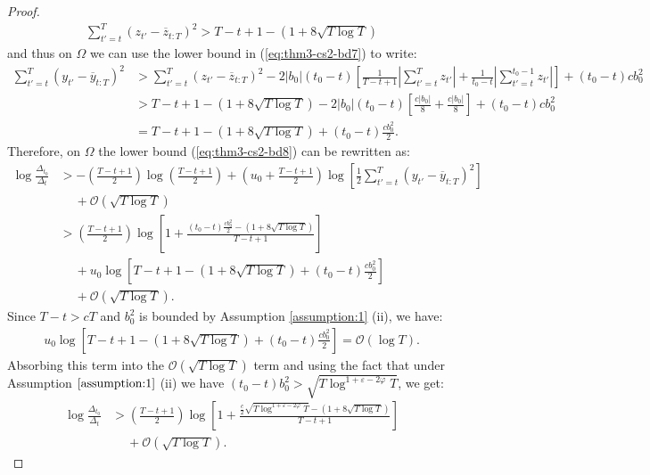 \begin{proof}
\begin{align*}
    \sum_{t'=t}^T (z_{t'} - \overline{z}_{t:T})^2 > T-t +1 - (1 + 8\sqrt{T \log T})
\end{align*}
and thus on $\Omega$ we can use the lower bound in (\ref{eq:thm3-cs2-bd7}) to write:
\begin{align*}
    \sum_{t'=t}^T (y_{t'} - \overline{y}_{t:T})^2 &> \sum_{t'=t}^T (z_{t'} - \overline{z}_{t:T})^2 - 2|b_0|(t_0-t)\left[\frac{1}{T-t+1} \left|\sum_{t'=t}^T z_{t'}\right| + \frac{1}{t_0-t}\left|\sum_{t' = t}^{t_0 - 1} z_{t'}\right|\right] + (t_0-t)cb_0^2 \\
    &> T-t +1 - (1 + 8\sqrt{T \log T}) - 2|b_0|(t_0-t)\left[\frac{c|b_0|}{8} + \frac{c|b_0|}{8}\right] + (t_0-t)cb_0^2 \\
    &= T-t +1 - (1 + 8\sqrt{T \log T}) + (t_0-t)\frac{cb_0^2}{2}.
\end{align*}
Therefore, on $\Omega$ the lower bound (\ref{eq:thm3-cs2-bd8}) can be rewritten as:
\begin{align*}
    \log \frac{\Delta_{t_0}}{\Delta_t} &> - \left(\frac{T - t + 1}{2}\right) \log\left(\frac{T-t+1}{2}\right) + \left(u_0 + \frac{T - t +1}{2}\right)\log\left[ \frac{1}{2}\sum_{t'=t}^T (y_{t'} - \overline{y}_{t:T})^2 \right] \\
    &\quad\: +  \mathcal{O}(\sqrt{T \log T}) \\
    &> \left(\frac{T - t + 1}{2}\right) \log\left[1 + \frac{(t_0-t)\frac{cb_0^2}{2} - (1 + 8\sqrt{T \log T})}{T-t+1}\right] \\
    &\quad\: + u_0 \log \left[T-t +1 - (1 + 8\sqrt{T \log T}) + (t_0-t)\frac{cb_0^2}{2}\right] \\
    &\quad\: +  \mathcal{O}(\sqrt{T \log T}).
\end{align*}
Since $T-t > cT$ and $b_0^2$ is bounded by Assumption \ref{assumption:1} (ii), we have:
\begin{align*}
    u_0 \log \left[T-t +1 - (1 + 8\sqrt{T \log T}) + (t_0-t)\frac{cb_0^2}{2}\right] = \mathcal{O} (\log T). 
\end{align*}
Absorbing this term into the $\mathcal{O}(\sqrt{T \log T})$ term and using the fact that under Assumption $\ref{assumption:1}$ (ii) we have $(t_0 - t) b_0^2 > \sqrt{T \log^{1 +\varepsilon-2\varphi} T}$, we get:
\begin{align*}
    \log \frac{\Delta_{t_0}}{\Delta_t} &> \left(\frac{T - t + 1}{2}\right) \log\left[1 + \frac{\frac{c}{2}\sqrt{T \log^{1 +\varepsilon-2\varphi} T} - (1 + 8\sqrt{T \log T})}{T-t+1}\right] \\
    &\quad\: +  \mathcal{O}(\sqrt{T \log T}).

\end{align*}
\end{proof}
